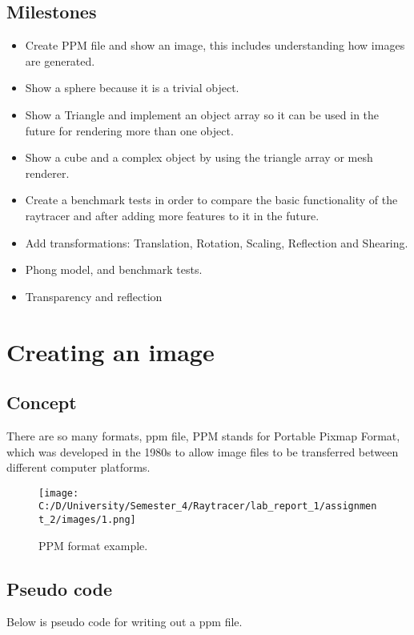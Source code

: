 \documentclass{article}
\begin{document}
\subsection{Milestones}
\label{definitions}
\begin{itemize}
	\item Create PPM file and show an image, this includes understanding how images are generated.
	\item Show a sphere because it is a trivial object.
	\item Show a Triangle and implement an object array so it can be used in the future for rendering more than one object.
	\item Show a cube and a complex object by using the triangle array or mesh renderer.
	\item Create a benchmark tests in order to compare the basic functionality of the raytracer and after adding more features to it in the future.
	\item Add transformations: Translation, Rotation, Scaling, Reflection
	and Shearing.
	\item Phong model, and benchmark tests.
	\item Transparency and reflection
\end{itemize}

 \clearpage

\section{Creating an image}
\subsection{Concept}
There are so many formats, ppm file, PPM stands for Portable Pixmap Format, which was developed in the 1980s to allow image files to be transferred between different computer platforms.

\begin{figure}[h]
	
	\texttt{[image: C:/D/University/Semester\_4/Raytracer/lab\_report\_1/assignment\_2/images/1.png]}
	
	\caption{PPM format example.}
	\label{fig:boat1}
\end{figure}

\subsection{Pseudo code}
Below is pseudo code for writing out a ppm file.
\end{document}
